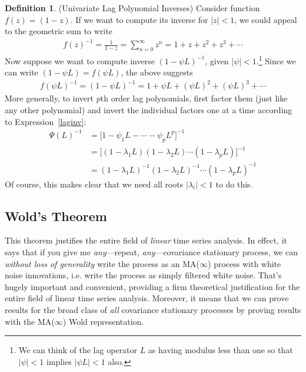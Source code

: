 \documentclass[12pt]{article}
\theoremstyle{plain}
\theoremstyle{definition}
\newtheorem{defn}[thm]{Definition}
\theoremstyle{remark}
\newcommand{\sumninfz}{\sum^\infty_{n=0}}
\begin{document}
\begin{defn}(Univariate Lag Polynomial Inverses)
Consider function $f(z)=(1-z)$. If we want to compute its inverse for
$|z|<1$, we could appeal to the geometric sum to write
\begin{align*}
  f(z)^{-1} = \frac{1}{1-z}
  = \sumninfz z^n
  = 1+z+z^2 + z^3 + \cdots
\end{align*}
Now suppose we want to compute inverse $(1-\psi L)^{-1}$, given
$|\psi|<1$.\footnote{%
  We can think of the lag operator $L$ as having modulus less than one
  so that $|\psi|<1$ implies $|\psi L|<1$ also.
}
Since we can write $(1-\psi L)=f(\psi L)$, the above suggests
\begin{align}
  f(\psi L)^{-1}
  = (1-\psi L)^{-1}
  = 1+\psi L+(\psi L)^2 + (\psi L)^3 + \cdots
  \label{laginv}
\end{align}
More generally, to invert $p$th order lag polynomials, first factor them
(just like any other polynomial) and invert the individual factors one
at a time according to Expression~\ref{laginv}:
\begin{align*}
  \Psi(L)^{-1}
  &= \big[1 - \psi_1 L - \cdots - \psi_pL^p\big]^{-1} \\
  &= \big[(1-\lambda_1L)(1-\lambda_2L)\cdots(1-\lambda_pL)\big]^{-1}
  \\
  &= (1-\lambda_1L)^{-1}(1-\lambda_2L)^{-1}\cdots(1-\lambda_pL)^{-1}
\end{align*}
Of course, this makes clear that we need all roots $|\lambda_i|<1$ to do
this.
\end{defn}


\clearpage
\subsection{Wold's Theorem}

This theorem justifies the entire field of \emph{linear} time series
analysis. In effect, it says that if you give me \emph{any}---repeat,
\emph{any}---covariance stationary process, we can
\emph{without loss of generality} write the process as an MA($\infty$)
process with white noise innovations, i.e. write the process as simply
filtered white noise.
That's hugely important and convenient, providing a firm theoretical
justification for the entire field of linear time series analysis.
Moreover, it means that we can prove results for the broad class of
\emph{all} covariance stationary processes by proving results with the
MA($\infty$) Wold representation.
\end{document}
